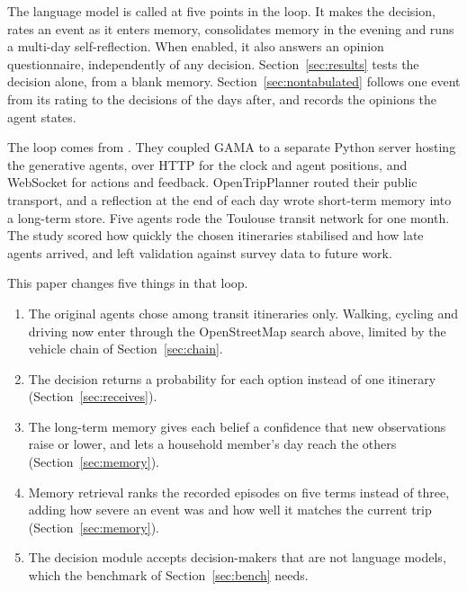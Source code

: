 The language model is called at five points in the loop. It makes the decision, rates an
event as it enters memory, consolidates memory in the evening and runs a multi-day
self-reflection. When enabled, it also answers an opinion questionnaire, independently of any
decision. Section~\ref{sec:results} tests the decision alone, from a blank memory.
Section~\ref{sec:nontabulated} follows one event from its rating to the decisions of the days
after, and records the opinions the agent states.

The loop comes from \citet{vu2025modeling}. They coupled GAMA to a separate Python server
hosting the generative agents, over HTTP for the clock and agent positions, and WebSocket for
actions and feedback. OpenTripPlanner routed their public transport, and a reflection at the
end of each day wrote short-term memory into a long-term store. Five agents rode the Toulouse
transit network for one month. The study scored how quickly the chosen itineraries
stabilised and how late agents arrived, and left validation against survey data to future
work.

This paper changes five things in that loop.

\begin{enumerate}
  \item The original agents chose among transit itineraries only. Walking, cycling and
    driving now enter through the OpenStreetMap search above, limited by the vehicle chain of
    Section~\ref{sec:chain}.
  \item The decision returns a probability for each option instead of one itinerary
    (Section~\ref{sec:receives}).
  \item The long-term memory gives each belief a confidence that new observations raise or
    lower, and lets a household member's day reach the others (Section~\ref{sec:memory}).
  \item Memory retrieval ranks the recorded episodes on five terms instead of three, adding
    how severe an event was and how well it matches the current trip
    (Section~\ref{sec:memory}).
  \item The decision module accepts decision-makers that are not language models, which the
    benchmark of Section~\ref{sec:bench} needs.
\end{enumerate}

